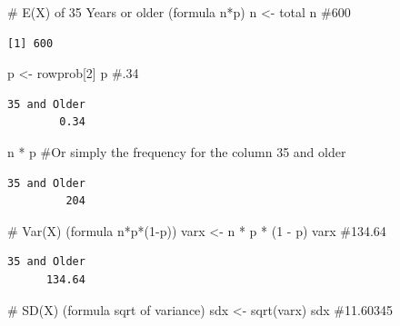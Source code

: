 \documentclass[
  letterpaper,
  DIV=11,
  numbers=noendperiod]{scrreprt}
\newenvironment{Shaded}{\begin{snugshade}}{\end{snugshade}}
\newcommand{\CommentTok}[1]{\textcolor[rgb]{0.37,0.37,0.37}{#1}}
\newcommand{\DecValTok}[1]{\textcolor[rgb]{0.68,0.00,0.00}{#1}}
\newcommand{\FunctionTok}[1]{\textcolor[rgb]{0.28,0.35,0.67}{#1}}
\newcommand{\NormalTok}[1]{\textcolor[rgb]{0.00,0.23,0.31}{#1}}
\newcommand{\OtherTok}[1]{\textcolor[rgb]{0.00,0.23,0.31}{#1}}
\newcommand{\SpecialCharTok}[1]{\textcolor[rgb]{0.37,0.37,0.37}{#1}}
\begin{document}
\begin{Shaded}
\begin{Highlighting}[]
\CommentTok{\# E(X) of 35 Years or older (formula n*p)}
\NormalTok{n }\OtherTok{\textless{}{-}}\NormalTok{ total}
\NormalTok{n  }\CommentTok{\#600}
\end{Highlighting}
\end{Shaded}

\begin{verbatim}
[1] 600
\end{verbatim}

\begin{Shaded}
\begin{Highlighting}[]
\NormalTok{p }\OtherTok{\textless{}{-}}\NormalTok{ rowprob[}\DecValTok{2}\NormalTok{]}
\NormalTok{p  }\CommentTok{\#.34}
\end{Highlighting}
\end{Shaded}

\begin{verbatim}
35 and Older 
        0.34 
\end{verbatim}

\begin{Shaded}
\begin{Highlighting}[]
\NormalTok{n }\SpecialCharTok{*}\NormalTok{ p  }\CommentTok{\#Or simply the frequency for the column 35 and older}
\end{Highlighting}
\end{Shaded}

\begin{verbatim}
35 and Older 
         204 
\end{verbatim}

\begin{Shaded}
\begin{Highlighting}[]
\CommentTok{\# Var(X) (formula n*p*(1{-}p))}
\NormalTok{varx }\OtherTok{\textless{}{-}}\NormalTok{ n }\SpecialCharTok{*}\NormalTok{ p }\SpecialCharTok{*}\NormalTok{ (}\DecValTok{1} \SpecialCharTok{{-}}\NormalTok{ p)}
\NormalTok{varx  }\CommentTok{\#134.64}
\end{Highlighting}
\end{Shaded}

\begin{verbatim}
35 and Older 
      134.64 
\end{verbatim}

\begin{Shaded}
\begin{Highlighting}[]
\CommentTok{\# SD(X) (formula sqrt of variance)}
\NormalTok{sdx }\OtherTok{\textless{}{-}} \FunctionTok{sqrt}\NormalTok{(varx)}
\NormalTok{sdx  }\CommentTok{\#11.60345 }
\end{Highlighting}
\end{Shaded}
\end{document}

